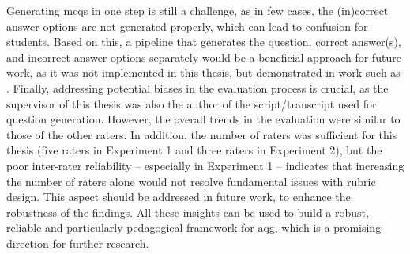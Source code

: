 Generating \acp{mcq} in one step is still a challenge, as in few cases, the (in)correct answer options are not generated properly, which can lead to confusion for students. Based on this, a pipeline that generates the question, correct answer(s), and incorrect answer options separately would be a beneficial approach for future work, as it was not implemented in this thesis, but demonstrated in work such as \cite{bhowmick_automating_2023}. Finally, addressing potential biases in the evaluation process is crucial, as the supervisor of this thesis was also the author of the script/transcript used for question generation. However, the overall trends in the evaluation were similar to those of the other raters. In addition, the number of raters was sufficient for this thesis (five raters in Experiment 1 and three raters in Experiment 2), but the poor inter-rater reliability -- especially in Experiment 1 -- indicates that increasing the number of raters alone would not resolve fundamental issues with rubric design. This aspect should be addressed in future work, to enhance the robustness of the findings. All these insights can be used to build a robust, reliable and particularly pedagogical framework for \ac{aqg}, which is a promising direction for further research.


